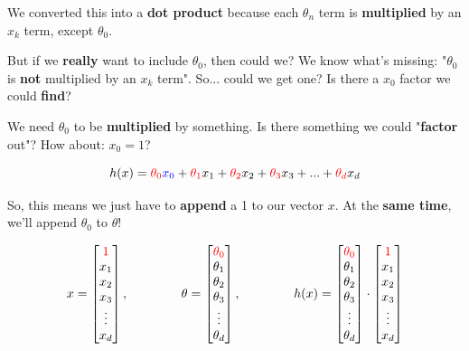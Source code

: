         We converted this into a \textbf{dot product} because each $\theta_n$ term is \textbf{multiplied} by an $x_k$ term, except $\theta_0$.
        
        But if we \textbf{really} want to include $\theta_0$, then could we? We know what's missing: "$\theta_0$ is \textbf{not} multiplied by an $x_k$ term". So... could we get one? Is there a $x_0$ factor we could \textbf{find}?
        
        We need $\theta_0$ to be \textbf{multiplied} by something. Is there something we could "\textbf{factor} out"? How about: $x_0=1$?
        
        \begin{equation}
            h(x) = \textcolor{red}{\theta_0}\textcolor{blue}{x_0} + \textcolor{red}{\theta_1}x_1 + \textcolor{red}{\theta_2}x_2 + \textcolor{red}{\theta_3}x_3 + ... + \textcolor{red}{\theta_d}x_d
        \end{equation}
        
        So, this means we just have to \textbf{append} a 1 to our vector $x$. At the \textbf{same time}, we'll append $\theta_0$ to $\theta$!
        
        \begin{equation}
            x = 
            \begin{bmatrix}
              \textcolor{red}{1} \\ x_1 \\ x_2 \\ x_3 \\ \vdots \\ x_d
            \end{bmatrix},
            \;\;\;\;\;\;\;\;\;\;\;\;\;\;\;
            \theta = 
            \begin{bmatrix}
              \textcolor{red}{\theta_0} \\ \theta_1 \\ \theta_2 \\ \theta_3 \\ \vdots \\ \theta_d
            \end{bmatrix},
            \;\;\;\;\;\;\;\;\;\;\;\;\;\;\;
            h(x) = 
            \begin{bmatrix}
              \textcolor{red}{\theta_0} \\ \theta_1 \\ \theta_2 \\ \theta_3 \\ \vdots \\ \theta_d
            \end{bmatrix}
            \cdot
            \begin{bmatrix}
              \textcolor{red}{1} \\ x_1 \\ x_2 \\ x_3 \\ \vdots \\ x_d
            \end{bmatrix}
        \end{equation}

